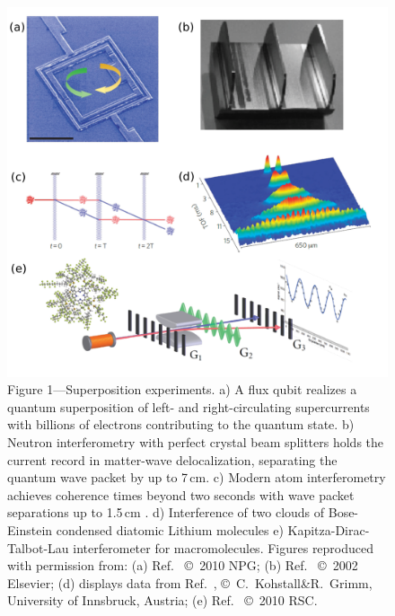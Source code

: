 \documentclass[11pt]{article}
\begin{document}
\begin{figure}
\includegraphics[width=1.04\columnwidth]{Fig1-arxiv.pdf}
\small{Figure 1---Superposition experiments.}
a) A flux qubit realizes a quantum superposition of left- and right-circulating supercurrents\cite{Friedman2000_long} with billions of 
electrons contributing to the quantum state. 
b) Neutron interferometry with perfect crystal beam splitters holds the current record in matter-wave delocalization\cite{Zawisky2002}, separating the 
quantum wave packet by up to 7\,cm.  
c) Modern atom interferometry achieves coherence times beyond two seconds with wave packet separations up to 1.5\,cm  \cite{Muentinga2013,Dickerson2013,Dimopoulos2007}.
d) Interference of two clouds of Bose-Einstein condensed diatomic Lithium molecules \cite{Kohstall2011}
e) Kapitza-Dirac-Talbot-Lau interferometer for macromolecules\cite{Gerlich2007,Tuexen2010,Eibenberger2013}.
Figures reproduced with permission from: ({a}) Ref.\  \copyright\  2010 NPG; ({b}) Ref.\  \copyright\ 2002 Elsevier; ({d}) displays data from Ref.\ , \copyright\ C.~Kohstall\&R.~Grimm, University of Innsbruck, Austria; ({e}) Ref.\  \copyright\ 2010 RSC.
\end{figure} 
\end{document}
